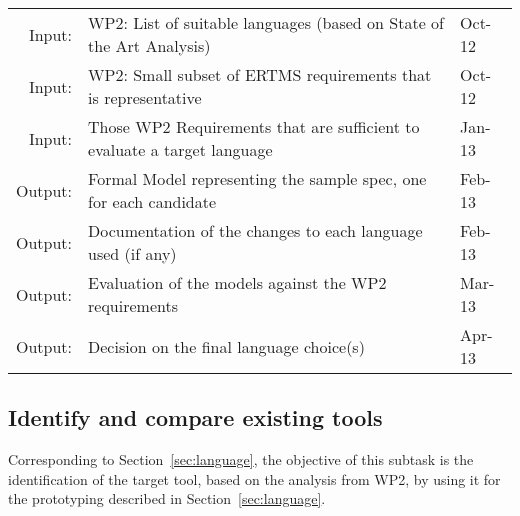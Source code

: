 \documentclass[11pt, a4paper]{article}
\let\oldmarginpar\marginpar
\renewcommand\marginpar[1]{\-\oldmarginpar[\raggedleft\scriptsize #1]%
{\raggedright\scriptsize #1}}
\newenvironment{inoutput}
{\vspace{2mm}
\noindent
\begin{tabular}{|r|p{.68\linewidth}|l|}
\hline}
{
\hline
\end{tabular}}
\begin{document}


\begin{inoutput}
Input: & WP2: List of suitable languages (based on State of the Art Analysis) & Oct-12 \\
Input: & WP2: Small subset of ERTMS requirements that is representative & Oct-12 \\
Input: & Those WP2 Requirements that are sufficient to evaluate a target language & Jan-13 \\
\hline
Output: & Formal Model representing the sample spec, one for each candidate & Feb-13 \\
Output: & Documentation of the changes to each language used (if any) & Feb-13 \\
Output: & Evaluation of the models against the WP2 requirements & Mar-13 \\
Output: & Decision on the final language choice(s) & Apr-13 \\
\end{inoutput}



\subsection{Identify and compare existing tools}
\label{sec:tool}

Corresponding to Section~\ref{sec:language}, the objective of this
subtask is the identification of the target tool, based on the
analysis from WP2, by using it for the prototyping described in
Section~\ref{sec:language}.
\end{document}
